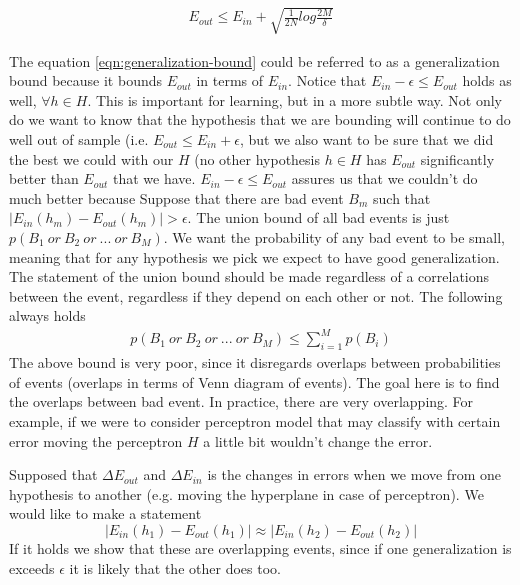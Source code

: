 \documentclass[../../main.tex]{subfiles}
\numberwithin{equation}{section}
\begin{document}
\begin{align}
    E_{out}\leq E_{in}+\sqrt{\frac{1}{2N}log\frac{2M}{\delta}}
\end{align}\label{eqn:generalization-bound}

The equation \ref{eqn:generalization-bound} could be referred to as a generalization bound because it bounds $E_{out}$ in terms of $E_{in}$. Notice that $E_{in}-\epsilon\leq E_{out}$ holds as well, $\forall h\in H$. This is important for learning, but in a more subtle way. Not only do we want to know that the hypothesis that we are bounding will continue to do well out of sample (i.e. $E_{out}\leq E_{in} + \epsilon$, but we also want to be sure that we did the best we could with our $H$ (no other hypothesis $h\in H$ has $E_{out}$ significantly better than $E_{out}$ that we have. $E_{in}-\epsilon\leq E_{out}$ assures us that we couldn't do much better because   
Suppose that there are bad event $B_m$ such that $|E_{in}(h_m)-E_{out}(h_m)|>\epsilon$. The union bound of all bad events is just $p(B_1 \ or\  B_2 \ or\  ... \ or\  B_M)$. We want the probability of any bad event to be small, meaning that for any hypothesis we pick we expect to have good generalization. The statement of the union bound should be made regardless of a correlations between the event, regardless if they depend on each other or not. The following always holds
\begin{align}
    p(B_1 \ or\  B_2 \ or\  ... \ or\  B_M)\leq \sum \limits_{i=1}^Mp(B_i)
\end{align}
The above bound is very poor, since it disregards overlaps between probabilities of events (overlaps in terms of Venn diagram of events). The goal here is to find the overlaps between bad event. In practice, there are very overlapping. For example, if we were to consider perceptron model that may classify with certain error moving the perceptron $H$ a little bit wouldn't change the error.

Supposed that $\Delta E_{out}$ and $\Delta E_{in}$ is the changes in errors when we move from one hypothesis to another (e.g. moving the hyperplane in case of perceptron). We would like to make a statement 
$$ |E_{in}(h_1)-E_{out}(h_1)|\approx |E_{in}(h_2)-E_{out}(h_2)| $$
If it holds we show that these are overlapping events, since if one generalization is exceeds $\epsilon$ it is likely that the other does too. 
\end{document}
